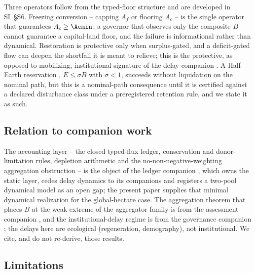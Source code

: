 Three operators follow from the typed-floor structure and are developed in SI~\S S6. Freezing conversion -- capping $A_f$ or flooring $A_c$ -- is the single operator that guarantees $A_c\ge\Acmin$; a governor that observes only the composite $B$ cannot guarantee a capital-land floor, and the failure is informational rather than dynamical. Restoration is protective only when surplus-gated, and a deficit-gated flow can deepen the shortfall it is meant to relieve; this is the protective, as opposed to mobilizing, institutional signature of the delay companion \citep{Abaee2026a}. A Half-Earth reservation \citep{Wilson2016}, $E\le\sigma B$ with $\sigma<1$, succeeds without liquidation on the nominal path, but this is a nominal-path consequence until it is certified against a declared disturbance class under a preregistered retention rule, and we state it as such.

\subsection{Relation to companion work}

The accounting layer -- the closed typed-flux ledger, conservation and donor-limitation rules, depletion arithmetic and the no-non-negative-weighting aggregation obstruction -- is the object of the ledger companion \citep{Abaee2026c}, which owns the static layer, cedes delay dynamics to its companions and registers a two-pool dynamical model as an open gap; the present paper supplies that minimal dynamical realization for the global-hectare case. The aggregation theorem that places $B$ at the weak extreme of the aggregator family is from the assessment companion \citep{Abaee2026b}, and the institutional-delay regime is from the governance companion \citep{Abaee2026a}; the delays here are ecological (regeneration, demography), not institutional. We cite, and do not re-derive, those results.

\subsection{Limitations}

